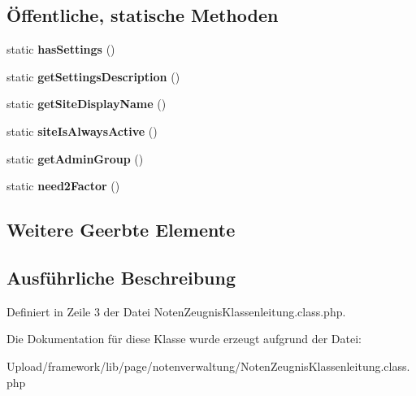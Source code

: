 \subsection*{Öffentliche, statische Methoden}
\begin{DoxyCompactItemize}
\item 
\mbox{\label{class_noten_zeugnis_klassenleitung_a2a16c070afe933933c6467c37468f26b}} 
static {\bfseries has\+Settings} ()
\item 
\mbox{\label{class_noten_zeugnis_klassenleitung_a5f3c09c986ab22e7e1d3f760219b65b7}} 
static {\bfseries get\+Settings\+Description} ()
\item 
\mbox{\label{class_noten_zeugnis_klassenleitung_a861677d0472dc761862f0da65c297b6f}} 
static {\bfseries get\+Site\+Display\+Name} ()
\item 
\mbox{\label{class_noten_zeugnis_klassenleitung_ad23c149994e4b89b89bc43989ead04d8}} 
static {\bfseries site\+Is\+Always\+Active} ()
\item 
\mbox{\label{class_noten_zeugnis_klassenleitung_a08c40ddc65dd5f68337f81bddf50baa7}} 
static {\bfseries get\+Admin\+Group} ()
\item 
\mbox{\label{class_noten_zeugnis_klassenleitung_ad3cc7d4c108fe3a6dd3a4db5e48d742c}} 
static {\bfseries need2\+Factor} ()
\end{DoxyCompactItemize}
\subsection*{Weitere Geerbte Elemente}


\subsection{Ausführliche Beschreibung}


Definiert in Zeile 3 der Datei Noten\+Zeugnis\+Klassenleitung.\+class.\+php.



Die Dokumentation für diese Klasse wurde erzeugt aufgrund der Datei\+:\begin{DoxyCompactItemize}
\item 
Upload/framework/lib/page/notenverwaltung/Noten\+Zeugnis\+Klassenleitung.\+class.\+php\end{DoxyCompactItemize}
